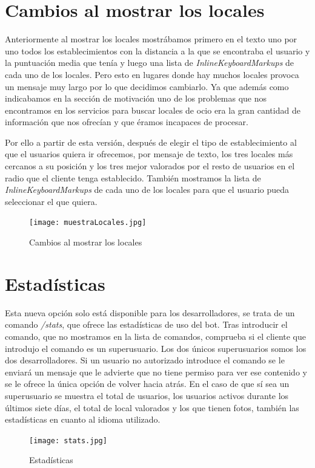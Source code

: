 \documentclass[oneside]{memoir}
\begin{document}
\section{Cambios al mostrar los locales}
Anteriormente al mostrar los locales mostrábamos primero en el texto uno por uno todos los establecimientos con la distancia a la que se encontraba el usuario y la puntuación media que tenía y luego una lista de \textit{InlineKeyboardMarkups} de cada uno de los locales. Pero esto en lugares donde hay muchos locales provoca un mensaje muy largo por lo que decidimos cambiarlo. Ya que además como indicabamos en la sección de motivación uno de los problemas que nos encontramos en los servicios para buscar locales de ocio era la gran cantidad de información que nos ofrecían y que éramos incapaces de procesar.

Por ello a partir de esta versión, después de elegir el tipo de establecimiento al que el usuarios quiera ir ofrecemos, por mensaje de texto, los tres locales más cercanos a su posición y los tres mejor valorados por el resto de usuarios en el radio que el cliente tenga establecido. También mostramos la lista  de \textit{InlineKeyboardMarkups} de cada uno de los locales para que el usuario pueda seleccionar el que quiera.

\begin{figure}[h!]
  \centering
  \texttt{[image: muestraLocales.jpg]}
  \caption{Cambios al mostrar los locales}
  \label{fig:muestraLocales}
\end{figure}

\section{Estadísticas}
Esta nueva opción solo está disponible para los desarrolladores, se trata de un comando \textit{/stats}, que ofrece las estadísticas de uso del bot. Tras introducir el comando, que no mostramos en la lista de comandos, comprueba si el cliente que introdujo el comando es un superusuario. Los dos únicos superusuarios somos los dos desarrolladores. Si un usuario no autorizado introduce el comando se le enviará un mensaje que le advierte que no tiene permiso para ver ese contenido y se le ofrece la única opción de volver hacia atrás. En el caso de que sí sea un superusuario se muestra el total de usuarios, los usuarios activos durante los últimos siete días, el total de local valorados y los que tienen fotos, también las estadísticas en cuanto al idioma utilizado.

\begin{figure}[h!]
  \centering
  \texttt{[image: stats.jpg]}
  \caption{Estadísticas}
  \label{fig:stats}
\end{figure}
\end{document}
